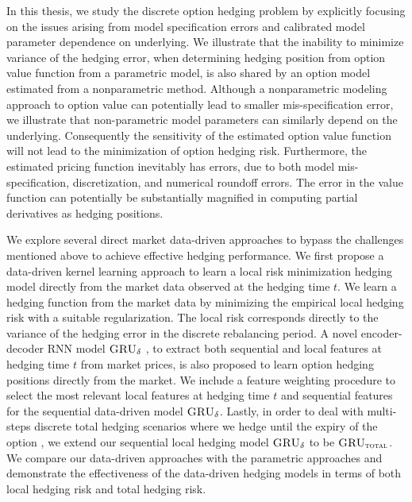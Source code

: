 \documentclass[letterpaper,12pt,titlepage,oneside,final]{book}
\numberwithin{equation}{section}
\theoremstyle{definition}
\newcommand{\model}{\textsc{GRU}_\delta}
\newcommand{\modelT}{\textsc{GRU}_{\textsc{total}}}
\begin{document}
In this thesis, we study the discrete option hedging problem by  explicitly focusing on the issues arising from  model specification errors and calibrated model parameter dependence on underlying.
We illustrate that the inability to minimize variance of the hedging error, when determining hedging position from option value function from a parametric model, is also shared by an option model estimated from a nonparametric method. Although a nonparametric modeling approach to option value can potentially lead to smaller mis-specification error, we illustrate that non-parametric model parameters can similarly depend on the underlying. Consequently the sensitivity of the estimated option value function will not lead to the minimization of option hedging risk.
Furthermore,  the estimated pricing function inevitably has errors, due to both model mis-specification, discretization, and numerical roundoff errors.
The error in the value function can potentially be substantially magnified in computing partial derivatives as hedging positions.

We explore several direct market data-driven approaches to bypass  the challenges mentioned above to achieve effective hedging performance.
We first propose a  data-driven kernel learning approach \cite{knian2017} to learn a local risk minimization hedging model directly from the market data observed at the hedging time $t$.  We learn a  hedging function from the market data by minimizing  the  empirical local hedging  risk with a suitable regularization. The local risk corresponds directly to the variance of the hedging error in the discrete rebalancing period. A novel encoder-decoder  RNN model $\model$ \cite{knian2019}, to extract both sequential and local features at hedging time $t$ from market prices, is also proposed to learn option hedging positions directly from the market. We include a feature weighting procedure to select the most relevant local features at hedging time $t$ and sequential features for the sequential data-driven model $\model$. Lastly, in order to deal with multi-steps discrete total hedging scenarios where we hedge until the expiry of the option \cite{knian2020}, we extend our sequential local hedging model $\model$ to be $\modelT$. We compare our data-driven approaches with the parametric approaches and demonstrate the effectiveness of the data-driven hedging models in terms of both local hedging risk and total hedging risk.





\end{document}
